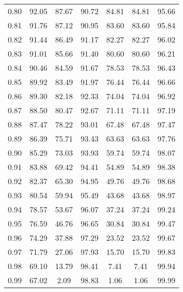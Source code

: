 \begin{tabular}{|c|c|c|c|c|c|c|}
      0.80 &     92.05 &     87.67 &      90.72 &   84.81 &      84.81 &         95.66 \\
      0.81 &     91.76 &     87.12 &      90.95 &   83.60 &      83.60 &         95.84 \\
      0.82 &     91.44 &     86.49 &      91.17 &   82.27 &      82.27 &         96.02 \\
      0.83 &     91.01 &     85.66 &      91.40 &   80.60 &      80.60 &         96.21 \\
      0.84 &     90.46 &     84.59 &      91.67 &   78.53 &      78.53 &         96.43 \\
      0.85 &     89.92 &     83.49 &      91.97 &   76.44 &      76.44 &         96.66 \\
      0.86 &     89.30 &     82.18 &      92.33 &   74.04 &      74.04 &         96.92 \\
      0.87 &     88.50 &     80.47 &      92.67 &   71.11 &      71.11 &         97.19 \\
      0.88 &     87.47 &     78.22 &      93.01 &   67.48 &      67.48 &         97.47 \\
      0.89 &     86.39 &     75.71 &      93.43 &   63.63 &      63.63 &         97.76 \\
      0.90 &     85.29 &     73.03 &      93.93 &   59.74 &      59.74 &         98.07 \\
      0.91 &     83.88 &     69.42 &      94.41 &   54.89 &      54.89 &         98.38 \\
      0.92 &     82.37 &     65.30 &      94.95 &   49.76 &      49.76 &         98.68 \\
      0.93 &     80.54 &     59.94 &      95.49 &   43.68 &      43.68 &         98.97 \\
      0.94 &     78.57 &     53.67 &      96.07 &   37.24 &      37.24 &         99.24 \\
      0.95 &     76.59 &     46.76 &      96.65 &   30.84 &      30.84 &         99.47 \\
      0.96 &     74.29 &     37.88 &      97.29 &   23.52 &      23.52 &         99.67 \\
      0.97 &     71.79 &     27.06 &      97.93 &   15.70 &      15.70 &         99.83 \\
      0.98 &     69.10 &     13.79 &      98.41 &    7.41 &       7.41 &         99.94 \\
      0.99 &     67.02 &      2.09 &      98.83 &    1.06 &       1.06 &         99.99 \\
\bottomrule
\end{tabular}
